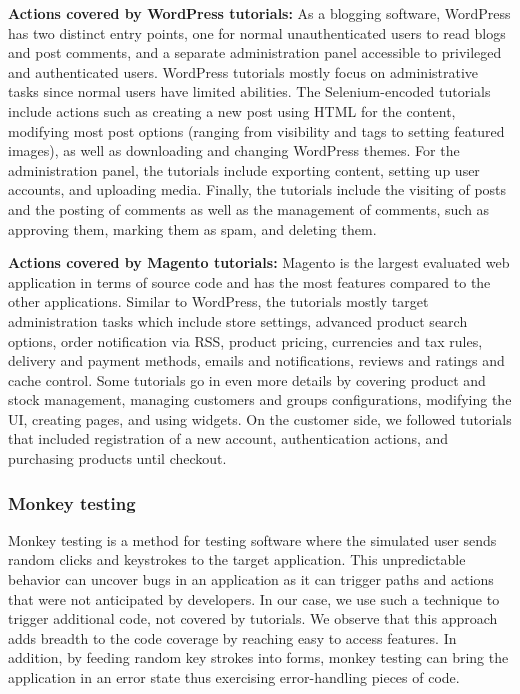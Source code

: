 \vspace{0.5ex}

\noindent \textbf{Actions covered by WordPress tutorials:} As a blogging software, WordPress has two distinct entry points, one for normal unauthenticated users to read blogs and post comments, and a separate administration panel accessible to privileged and authenticated users.
WordPress tutorials mostly focus on administrative tasks since normal users have limited abilities. The Selenium-encoded tutorials include actions such as creating a new post using HTML for the content, modifying most post options (ranging from visibility and tags to setting featured images), as well as downloading and changing WordPress themes.
For the administration panel, the tutorials include exporting content, setting up user accounts, and uploading media. Finally, the tutorials include the visiting of posts and the posting of comments as well as the management of comments, such as approving them, marking them as spam, and deleting them.
\vspace{0.5ex}

\noindent \textbf{Actions covered by Magento tutorials:} Magento is the largest evaluated web application in terms of source code and has the most features compared to the other applications. Similar to WordPress, the tutorials mostly target administration tasks which include store settings, advanced product search options, order notification via RSS, product pricing, currencies and tax rules, delivery and payment methods, emails and notifications, reviews and ratings and cache control. Some tutorials go in even more details by covering product and stock management, managing customers and groups configurations, modifying the UI, creating pages, and using widgets.
On the customer side, we followed tutorials that included registration of a new account, authentication actions, and purchasing products until checkout.






\subsubsection{Monkey testing}
\label{sec:monkey}
Monkey testing is a method for testing
software where the simulated user sends random clicks and keystrokes to the
target application. This unpredictable behavior can uncover bugs in an
application as it can trigger paths and actions that were not anticipated by
developers. In our case, we use such a technique to trigger additional code,
not covered by tutorials. We observe that this approach adds breadth to the
code coverage by reaching easy to access features. In addition, by feeding
random key strokes into forms, monkey testing can bring the application in an
error state thus exercising error-handling pieces of code.

